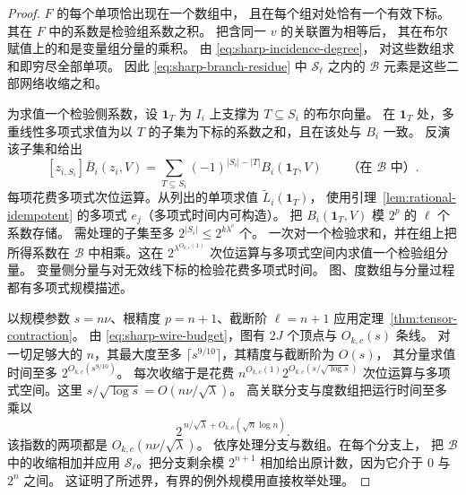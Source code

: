 \begin{proof}
$F$ 的每个单项恰出现在一个数组中，
且在每个组对处恰有一个有效下标。
其在 $F$ 中的系数是检验组系数之积。
把含同一 $v$ 的关联置为相等后，
其在布尔赋值上的和是变量组分量的乘积。
由 \eqref{eq:sharp-incidence-degree}，
对这些数组求和即穷尽全部单项。
因此 \eqref{eq:sharp-branch-residue} 中
$\mathcal S_\ell$ 之内的 $\mathcal B$
元素是这些二部网络收缩之和。

为求值一个检验侧系数，设 $\mathbf1_T$
为 $I_i$ 上支撑为 $T\subseteq S_i$ 的布尔向量。
在 $\mathbf1_T$ 处，多重线性多项式求值为以 $T$
的子集为下标的系数之和，且在该处与 $B_i$ 一致。
反演该子集和给出
\[
 [z_{i,S_i}]\overline B_i(z_i,V)=
 \sum_{T\subseteq S_i}(-1)^{|S_i|-|T|}B_i(\mathbf1_T,V)
 \qquad\text{（在 }\mathcal B\text{ 中）}.
\]
每项花费多项式次位运算。从列出的单项求值
$\widetilde L_i(\mathbf1_T)$，
使用引理~\ref{lem:rational-idempotent}
的多项式 $e_j$（多项式时间内可构造）。
把 $B_i(\mathbf1_T,V)$ 模 $2^p$
的 $\ell$ 个系数存储。
需处理的子集至多 $2^{|S_i|}\le 2^{k\lambda^c}$ 个。
一次对一个检验求和，并在组上把所得系数在 $\mathcal B$
中相乘。这在 $2^{\lambda^{O_{k,c}(1)}}$
次位运算与多项式空间内求值一个检验组分量。
变量侧分量与对无效线下标的检验花费多项式时间。
图、度数组与分量过程都有多项式规模描述。

以规模参数 $s=n\nu$、根精度 $p=n+1$、截断阶
$\ell=n+1$ 应用定理~\ref{thm:tensor-contraction}。
由 \eqref{eq:sharp-wire-budget}，图有 $2J$
个顶点与 $O_{k,c}(s)$ 条线。
对一切足够大的 $n$，其最大度至多
$\lceil s^{9/10}\rceil$，其精度与截断阶为 $O(s)$，
其分量求值时间至多 $2^{O_{k,c}(s^{9/10})}$。
每次收缩于是花费
$n^{O_{k,c}(1)}2^{O_{k,c}(s/\sqrt{\log s})}$
次位运算与多项式空间。这里
$s/\sqrt{\log s}=O(n\nu/\sqrt\lambda)$。
高关联分支与度数组把运行时间至多乘以
\[
 2^{\,n/\sqrt{\lambda}+O_{k,c}(\sqrt n\log n)}.
\]
该指数的两项都是 $O_{k,c}(n\nu/\sqrt{\lambda})$。
依序处理分支与数组。在每个分支上，
把 $\mathcal B$ 中的收缩相加并应用
$\mathcal S_\ell$。把分支剩余模 $2^{n+1}$
相加给出原计数，因为它介于 $0$ 与 $2^n$ 之间。
这证明了所述界，有界的例外规模用直接枚举处理。
\end{proof}

